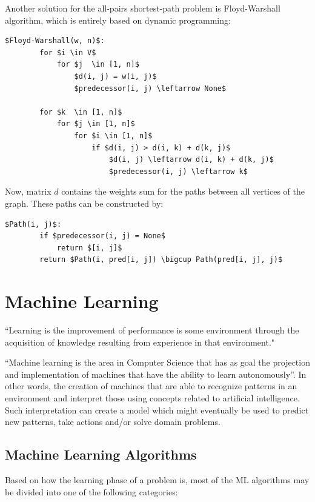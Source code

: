 \documentclass[12pt]{report}
\begin{document}
Another solution for the all-pairs shortest-path problem is Floyd-Warshall algorithm, which is entirely based on dynamic programming:

\begin{lstlisting}[mathescape]
    $Floyd-Warshall(w, n)$:
        for $i \in V$
            for $j  \in [1, n]$
                $d(i, j) = w(i, j)$
                $predecessor(i, j) \leftarrow None$

        for $k  \in [1, n]$
            for $j \in [1, n]$
                for $i \in [1, n]$
                    if $d(i, j) > d(i, k) + d(k, j)$
                        $d(i, j) \leftarrow d(i, k) + d(k, j)$
                        $predecessor(i, j) \leftarrow k$
\end{lstlisting}

Now, matrix $d$ contains  the weights sum for the paths between all vertices of the graph. These paths can be constructed by:
\begin{lstlisting}[mathescape]
    $Path(i, j)$:
        if $predecessor(i, j) = None$
            return $[i, j]$
        return $Path(i, pred[i, j]) \bigcup Path(pred[i, j], j)$
\end{lstlisting}

\section{Machine Learning}
“Learning is the improvement of performance is some environment through the acquisition of knowledge resulting from experience in that environment." \cite{pat1996}

“Machine learning is the area in Computer Science that has as goal the projection and implementation of machines that have the ability to learn autonomously”. \cite{hot2009} In other words, the creation of machines that are able to recognize patterns in an environment and interpret those using concepts related to artificial intelligence. Such interpretation can create a model which might eventually be used to predict new patterns, take actions and/or solve domain problems.

\subsection{Machine Learning Algorithms}

Based on how the learning phase of a problem is, most of the ML algorithms may be divided into one of the following categories:
\end{document}
